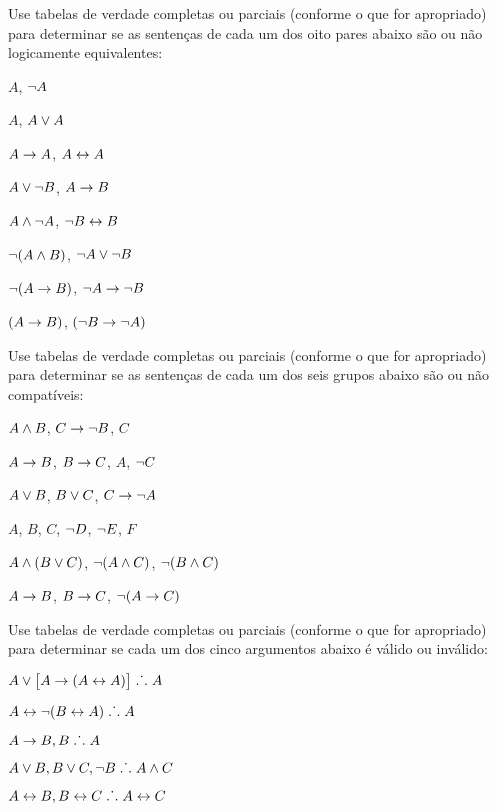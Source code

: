 \practiceproblems
\solutions

\solutions
\problempart
\label{pr.TT.equiv3}
Use tabelas de verdade completas ou parciais (conforme o que for apropriado) para determinar se as sentenças de cada um dos oito pares abaixo são ou não logicamente equivalentes:
\begin{earg}
\item $A$, $\neg A$ %
\item $A$, $A \vee A$ %
\item $A\rightarrow A$, $A \leftrightarrow A$ %
\item $A \vee \neg B$, $A\rightarrow B$ %
\item $A \wedge \neg A$, $\neg B \leftrightarrow B$ %
\item $\neg(A \wedge B)$, $\neg A \vee \neg B$ %
\item $\neg(A \rightarrow B)$, $\neg A \rightarrow \neg B$ %
\item $(A \rightarrow B)$, $(\neg B \rightarrow \neg A)$ %
\end{earg}

\solutions
\problempart
\label{pr.TT.satisfiable4}
Use tabelas de verdade completas ou parciais (conforme o que for apropriado) para determinar se as sentenças de cada um dos seis grupos abaixo são ou não compatíveis:
\begin{earg}
\item $A \wedge B$, $C\rightarrow \neg B$, $C$ %
\item $A\rightarrow B$, $B\rightarrow C$, $A$, $\neg C$ %
\item $A \vee B$, $B\vee C$, $C\rightarrow \neg A$ %
\item $A$, $B$, $C$, $\neg D$, $\neg E$, $F$ %
\item $A \wedge (B \vee C)$, $\neg(A \wedge C)$, $\neg(B \wedge C)$ %
\item $A \rightarrow B$, $B \rightarrow C$, $\neg(A \rightarrow C)$ %
\end{earg}

\solutions
\problempart
\label{pr.TT.valid4}
Use tabelas de verdade completas ou parciais (conforme o que for apropriado) para determinar se cada um dos cinco argumentos abaixo é válido ou inválido:
\begin{earg}
\item $A\vee\bigl[A\rightarrow(A\leftrightarrow A)\bigr] \mathrel{\ldotp\dot{}\,\ldotp} A$ %
\item $A\leftrightarrow\neg(B\leftrightarrow A) \mathrel{\ldotp\dot{}\,\ldotp} A$ %
\item $A\rightarrow B, B \mathrel{\ldotp\dot{}\,\ldotp} A$ %
\item $A\vee B, B\vee C, \neg B \mathrel{\ldotp\dot{}\,\ldotp} A \wedge C$ %
\item $A\leftrightarrow B, B\leftrightarrow C \mathrel{\ldotp\dot{}\,\ldotp} A\leftrightarrow C$ %
\end{earg}

